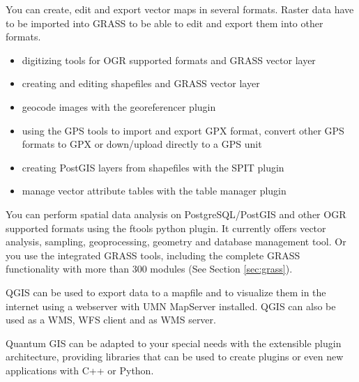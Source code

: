 You can create, edit and export vector maps in several formats. Raster data
have to be imported into GRASS to be able to edit and export them into other
formats.  

\begin{itemize}
\item digitizing tools for OGR supported formats and GRASS vector layer
\item creating and editing shapefiles and GRASS vector layer
\item geocode images with the georeferencer plugin
\item using the GPS tools to import and export GPX format, convert other GPS
formats to GPX or down/upload directly to a GPS unit
\item creating PostGIS layers from shapefiles with the SPIT plugin
\item manage vector attribute tables with the table manager plugin  
\end{itemize}


You can perform spatial data analysis on PostgreSQL/PostGIS and other OGR
supported formats using the ftools python plugin. It currently offers
vector analysis, sampling, geoprocessing, geometry and database management
tool. Or you use the integrated GRASS tools, including the complete GRASS
functionality with more than 300 modules (See Section \ref{sec:grass}).


QGIS can be used to export data to a mapfile and to visualize them in the
internet using a webserver with UMN MapServer installed. QGIS can also
be used as a WMS, WFS client and as WMS server. 


Quantum GIS can be adapted to your special needs with the extensible
plugin architecture, providing libraries that can be used to create plugins
or even new applications with C++ or Python.     

